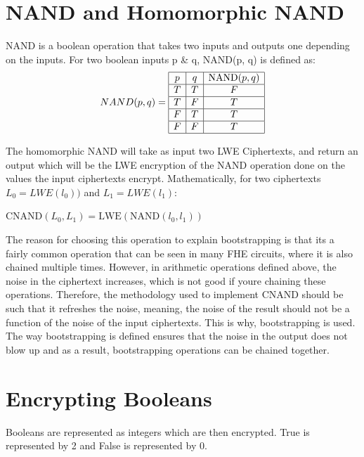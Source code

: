 \documentclass{report}
\begin{document}
\section{NAND and Homomorphic NAND}
NAND is a boolean operation that takes two inputs and outputs one depending on the inputs. For two boolean inputs p \& q, NAND(p, q) is defined as:
\begin{displaymath}
	NAND(p, q) = 
	\begin{array}{|c|c|c|}
		\hline
		p & q & \text{NAND}(p, q) \\ \hline
		T & T & F \\ \hline
		T & F & T \\ \hline
		F & T & T \\ \hline
		F & F & T \\ \hline
	\end{array}
\end{displaymath}

The homomorphic NAND will take as input two LWE Ciphertexts, and return an output which will be the LWE encryption of the NAND operation done on the values the input ciphertexts encrypt. Mathematically, for two ciphertexts $L_0 = LWE(l_0))$ and $L_1 = LWE(l_1)$:
\begin{center}
	$\text{CNAND}(L_0, L_1) = \text{LWE}(\text{NAND}(l_0, l_1))$
\end{center}

The reason for choosing this operation to explain bootstrapping is that its a fairly common operation that can be seen in many FHE circuits, where it is also chained multiple times. However, in arithmetic operations defined above, the noise in the ciphertext increases, which is not good if youre chaining these operations. Therefore, the methodology used to implement CNAND should be such that it refreshes the noise, meaning, the noise of the result should not be a function of the noise of the input ciphertexts. This is why, bootstrapping is used. The way bootstrapping is defined ensures that the noise in the output does not blow up and as a result, bootstrapping operations can be chained together.

\section{Encrypting Booleans}
Booleans are represented as integers which are then encrypted. True is represented by 2 and False is represented by 0.
\end{document}
